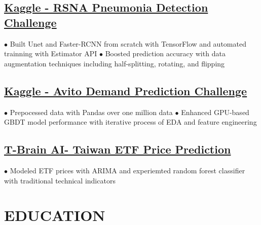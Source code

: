 \documentclass[11pt,a4paper]{moderncv}
\begin{document}
\subsection{\href{https://www.kaggle.com/c/rsna-pneumonia-detection-challenge}{\small Kaggle - RSNA Pneumonia Detection Challenge}}
{\footnotesize{$\bullet$ Built Unet and Faster-RCNN from scratch with TensorFlow and automated trainning with Estimator API
\newline $\bullet$ Boosted prediction accuracy with data augmentation techniques including half-splitting, rotating, and flipping}}

\subsection{\href{https://www.kaggle.com/c/avito-demand-prediction}{\small Kaggle - Avito Demand Prediction Challenge}}
{\footnotesize{$\bullet$ Prepocessed data with Pandas over one million data
\newline $\bullet$ Enhanced GPU-based GBDT model performance with iterative process of EDA and feature engineering}}

\subsection{\href{https://tbrain.trendmicro.com.tw/Competitions/Details/2}{\small T-Brain AI- Taiwan ETF Price Prediction}}
{\footnotesize{$\bullet$ Modeled ETF prices with ARIMA and experiemted random forest classifier with traditional technical indicators}}
\vspace{-0.7\baselineskip}

\section{EDUCATION}
\vspace{-0.75\baselineskip}
\end{document}
